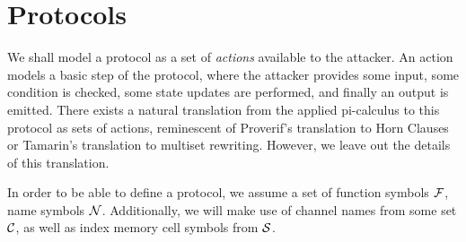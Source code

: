 \section{Protocols}

We shall model a protocol as a set of \emph{actions} available to the
attacker. An action models a basic step of the protocol, where
the attacker provides some input, some condition is checked, some
state updates are performed, and finally an output is emitted.
There exists a natural translation from the applied pi-calculus to this
protocol as sets of actions, reminescent of Proverif's translation to Horn
Clauses or Tamarin's translation to multiset rewriting. However, we leave out
the details of this translation.

In order to be able to define a protocol, we assume a set of function
symbols $\mathcal{F}$, name symbols $\mathcal{N}$.
Additionally, we will make use of channel names from some set $\mathcal{C}$,
as well as index memory cell symbols from $\mathcal{S}$.

